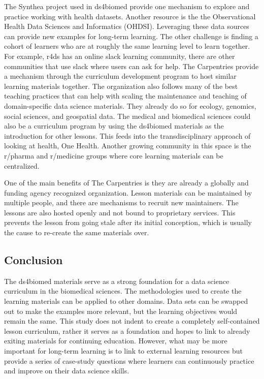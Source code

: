 \documentclass[030-workshop.tex]{subfiles}
\begin{document}
        The Synthea project used in ds4biomed provide one mechanism to explore and practice working with health datasets.
        Another resource is the the Observational Health Data Sciences and Informatics (OHDSI).
        Leveraging these data sources can provide new examples for long-term learning.
        The other challenge is finding a cohort of learners who are at roughly the same learning level to learn together.
        For example, r4ds has an online slack learning community,
        there are other communities that use slack where users can ask for help.
        The Carpentries provide a mechanism through the curriculum development program to host similar learning materials together.
        The organization also follows many of the best teaching practices that can help with scaling the maintenance and
        teaching of domain-specific data science materials.
        They already do so for ecology, genomics, social sciences, and geospatial data.
        The medical and biomedical sciences could also be a curriculum program by using the ds4biomed materials as the introduction
        for other lessons.
        This feeds into the transdisciplinary approach of looking at health, One Health.
        Another growing community in this space is the r/pharma and r/medicine groups where core learning materials
        can be centralized.

        One of the main benefits of The Carpentries is they are already a globally and funding agency recognized organization.
        Lesson materials can be maintained by multiple people, and there are mechanisms to recruit new maintainers.
        The lessons are also hosted openly and not bound to proprietary services.
        This prevents the lesson from going stale after its initial conception,
        which is usually the cause to re-create the same materials over.

    \subsection{Conclusion}

        The ds4biomed materials serve as a strong foundation for a data science curriculum in the biomedical sciences.
        The methodologies used to create the learning materials can be applied to other domains.
        Data sets can be swapped out to make the examples more relevant,
        but the learning objectives would remain the same.
        This study does not indent to create a completely self-contained lesson curriculum,
        rather it serves as a foundation and hopes to link to already exiting materials for continuing education.
        However, what may be more important for long-term learning
        is to link to external learning resources but provide a series of case-study questions
        where learners can continuously practice and improve on their data science skills.
\end{document}
